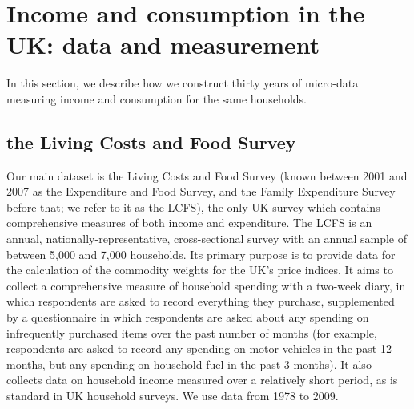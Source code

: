 \section{Income and consumption in the UK: data and measurement}\label{sec:measure}

In this section, we describe how we construct thirty years of micro-data measuring income and consumption for the same households. 


\subsection{the Living Costs and Food Survey}

Our main dataset is the Living Costs and Food Survey (known between 2001 and 2007 as the Expenditure and Food Survey, and the Family Expenditure Survey before that; we refer to it as the LCFS), the only UK survey which contains comprehensive measures of both income and expenditure. The LCFS is an annual, nationally-representative, cross-sectional survey with an annual sample of between 5,000 and 7,000 households. Its primary purpose is to provide data for the calculation of the commodity  weights for the UK's price indices. It aims to collect a comprehensive measure of household spending with a two-week diary, in which respondents are asked to record everything they  purchase, supplemented by a questionnaire in which respondents are asked about any spending on infrequently purchased items over the past number of months (for example, respondents are asked to record any spending on motor vehicles in the past 12 months, but any spending on household fuel in the past 3 months). It also collects data on household income measured over a relatively short period, as is standard in UK household surveys. We use data from 1978 to 2009.

